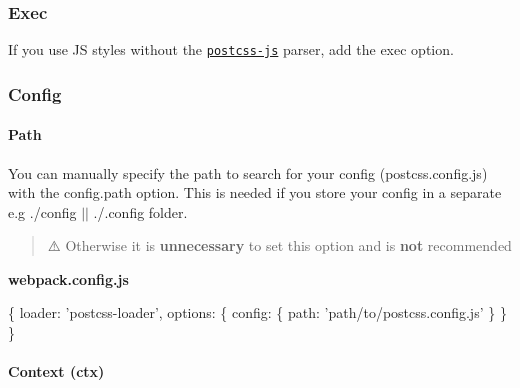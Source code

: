 \subsubsection*{{\ttfamily Exec}}

If you use JS styles without the \href{https://github.com/postcss/postcss-js}{\tt {\ttfamily postcss-\/js}} parser, add the {\ttfamily exec} option.




\subsubsection*{{\ttfamily Config}}

\paragraph*{{\ttfamily Path}}

You can manually specify the path to search for your config ({\ttfamily postcss.\+config.\+js}) with the {\ttfamily config.\+path} option. This is needed if you store your config in a separate e.\+g {\ttfamily ./config $\vert$$\vert$ ./.config} folder.

\begin{quote}
⚠️ Otherwise it is {\bfseries unnecessary} to set this option and is {\bfseries not} recommended \end{quote}


{\bfseries webpack.\+config.\+js} 
\begin{DoxyCode}
\{
  loader: 'postcss-loader',
  options: \{
    config: \{
      path: 'path/to/postcss.config.js'
    \}
  \}
\}
\end{DoxyCode}


\paragraph*{{\ttfamily Context (ctx)}}

